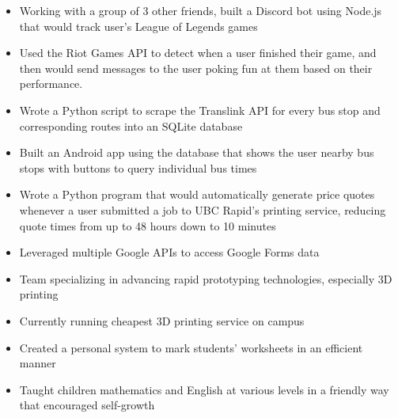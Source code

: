 \documentclass{resume}
\begin{document}
\begin{itemize}
	\item Working with a group of 3 other friends, built a Discord bot using Node.js that would track user's League of Legends games
	\item Used the Riot Games API to detect when a user finished their game, and then would send messages to the user poking fun at them based on their performance.
\end{itemize}

\begin{itemize}
	\item Wrote a Python script to scrape the Translink API for every bus stop and corresponding routes into an SQLite database
	\item Built an Android app using the database that shows the user nearby bus stops with buttons to query individual bus times
\end{itemize}

\begin{itemize}
	\item Wrote a Python program that would automatically generate price quotes whenever a user submitted a job to UBC Rapid's printing service, reducing quote times from up to 48 hours down to 10 minutes
	\item Leveraged multiple Google APIs to access Google Forms data
\end{itemize}

\StudentTeams

\begin{itemize}
	\item Team specializing in advancing rapid prototyping technologies, especially 3D printing
	\item Currently running cheapest 3D printing service on campus
\end{itemize}

\OtherWorkExperience

\begin{itemize}
	\item Created a personal system to mark students' worksheets in an efficient manner
	\item Taught children mathematics and English at various levels in a friendly way that encouraged self-growth
\end{itemize}
\end{document}
